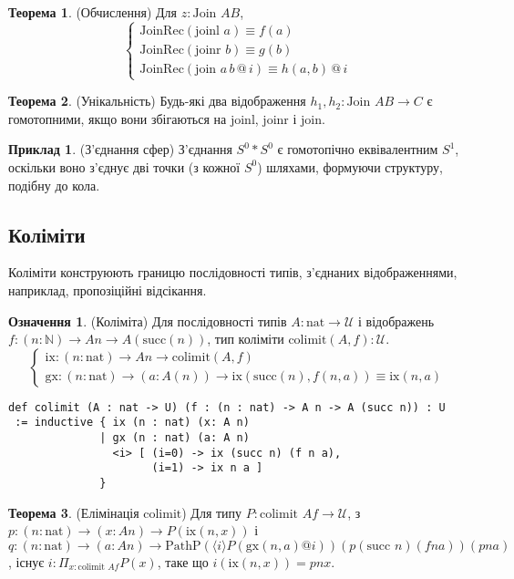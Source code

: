 \documentclass{article}
\theoremstyle{definition}
\newtheorem{theorem}{Теорема}
\newtheorem{definition}{Означення}
\newtheorem{example}{Приклад}
\begin{document}
\begin{theorem} (Обчислення)
Для \( z : \text{Join } A B \),
\[
\begin{cases}
\text{JoinRec}(\text{joinl } a) \equiv f(a) \\
\text{JoinRec}(\text{joinr } b) \equiv g(b) \\
\text{JoinRec}(\text{join } a \, b \, @ \, i) \equiv h(a, b) \, @ \, i
\end{cases}
\]
\end{theorem}

\begin{theorem} (Унікальність)
Будь-які два відображення \( h_1, h_2 : \text{Join } A B \to C \) є гомотопними,
якщо вони збігаються на \( \text{joinl} \), \( \text{joinr} \) і \( \text{join} \).
\end{theorem}

\begin{example} (З’єднання сфер)
З’єднання \( S^0 * S^0 \) є гомотопічно еквівалентним \( S^1 \), оскільки воно з’єднує
дві точки (з кожної \( S^0 \)) шляхами, формуючи структуру, подібну до кола.
\end{example}

\subsection{Коліміти}
Коліміти конструюють границю послідовності типів, з’єднаних відображеннями,
наприклад, пропозіційні відсікання.

\begin{definition} (Коліміта)
Для послідовності типів \( A : \text{nat} \to \mathcal{U} \) і
відображень \( f : (n : \mathbb{N}) \to A n \to A(\text{succ}(n)) \),
тип коліміти \( \text{colimit}(A,f) : \mathcal{U} \).
\[
\begin{cases}
\text{ix} : (n : \text{nat}) \to A n \to \text{colimit}(A,f) \\
\text{gx} : (n : \text{nat}) \to (a : A(n)) \to \text{ix} (\text{succ}(n),f(n,a)) \equiv \text{ix}(n,a)
\end{cases}
\]
\begin{lstlisting}
def colimit (A : nat -> U) (f : (n : nat) -> A n -> A (succ n)) : U
 := inductive { ix (n : nat) (x: A n)
              | gx (n : nat) (a: A n)
                <i> [ (i=0) -> ix (succ n) (f n a),
                      (i=1) -> ix n a ]
              }
\end{lstlisting}
\end{definition}

\begin{theorem} (Елімінація \( \text{colimit} \))
Для типу \( P : \text{colimit } A f \to \mathcal{U} \),
з \( p : (n : \text{nat}) \to (x : A n) \to P(\text{ix}(n, x)) \)
і \( q : (n : \text{nat}) \to (a : A n) \to \text{PathP} (\langle i \rangle P(\text{gx}(n, a) @ i)) (p (\text{succ } n) (f n a)) (p n a) \),
існує \( i : \Pi_{x:\text{colimit } A f} P(x) \), таке що \( i(\text{ix}(n, x)) = p n x \).
\end{theorem}
\end{document}
